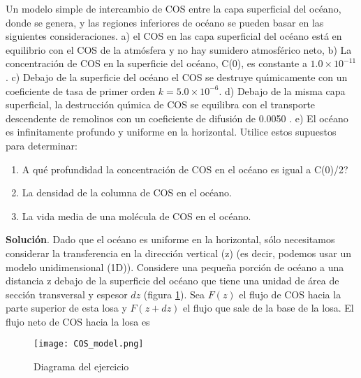 \begin{example} Un modelo simple de intercambio de COS entre la capa superficial del océano, donde se genera, y las regiones inferiores de océano se pueden basar en las siguientes consideraciones. a) el COS en las capa superficial del océano está en equilibrio con el COS de la atmósfera y no hay sumidero atmosférico neto, b) La concentración de COS en la superficie del océano, C(0), es constante a $1.0\times10^{-11}$\kilogrampercubicmetre. c) Debajo de la superficie del océano el COS se destruye qu\'{\i}micamente con  un coeficiente de tasa de primer orden $k=5.0\times10^{-6}$\per\second. d)  Debajo de la misma capa superficial, la destrucción qu\'{\i}mica de COS se equilibra con el transporte descendente de remolinos con un coeficiente de difusión de 0.0050 \metre\per\square\second. e) El océano es infinitamente profundo y uniforme en la horizontal. Utilice estos supuestos para determinar:
\begin{enumerate}
\item  \textquestiondown A qué profundidad la concentración de COS en el océano es igual a C(0)/2?
 \item  La densidad de la columna de COS en el océano.
 \item La vida media de una molécula de COS en el océano.
 \end{enumerate}
 
\textbf{Solución}. Dado que el océano es uniforme en la horizontal, sólo necesitamos considerar la transferencia en la dirección vertical (z) (es decir, podemos usar un modelo unidimensional (1D)). Considere una pequeña porción de océano a una distancia z debajo de la superficie del océano que tiene una unidad de área de sección transversal y espesor $dz$ (figura \ref{COS_fig}). Sea $F(z)$ el flujo de COS hacia la parte superior de esta losa y $F(z + dz)$ el flujo que sale de la base de la losa. El flujo neto de COS hacia la losa es
 
 \begin{figure}[hbtp]
\begin{center}
\texttt{[image: COS\_model.png]}
\caption{Diagrama del ejercicio}
\label{COS_fig}
\end{center}
\end{figure}


\end{example}
